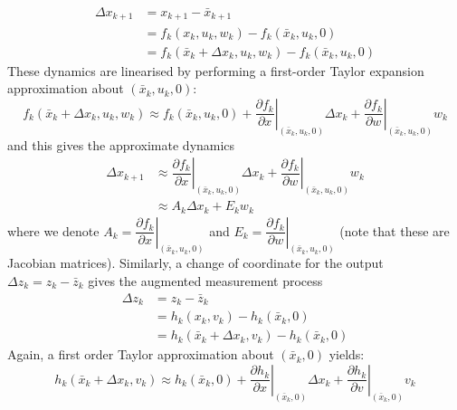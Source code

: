 \documentclass[11pt]{report} %
\begin{document}
\begin{align}
\Delta x_{k + 1} &= x_{k + 1} - \bar{x}_{k + 1} \\
&= f_{k}\left(x_{k}, u_{k}, w_{k}\right) - f_{k}\left(\bar{x}_{k}, u_{k}, 0\right) \\
&= f_{k}\left(\bar{x}_{k} + \Delta x_{k}, u_{k}, w_{k}\right) - f_{k}\left(\bar{x}_{k}, u_{k}, 0\right)
\end{align}
These dynamics are linearised by performing a first-order Taylor expansion approximation about $\left(\bar{x}_{k}, u_{k}, 0\right)$:
\begin{equation}
f_{k}\left(\bar{x}_{k} + \Delta x_{k}, u_{k}, w_{k}\right) \approx f_{k}\left(\bar{x}_{k}, u_{k}, 0\right) + \left.\dfrac{\partial f_{k}}{\partial x}\right|_{\left(\bar{x}_{k}, u_{k}, 0\right)}\Delta x_{k} + \left.\dfrac{\partial f_{k}}{\partial w}\right|_{\left(\bar{x}_{k}, u_{k}, 0\right)}w_{k}
\end{equation}
and this gives the approximate dynamics
\begin{align}
\Delta x_{k + 1} &\approx \left.\dfrac{\partial f_{k}}{\partial x}\right|_{\left(\bar{x}_{k}, u_{k}, 0\right)}\Delta x_{k} + \left.\dfrac{\partial f_{k}}{\partial w}\right|_{\left(\bar{x}_{k}, u_{k}, 0\right)}w_{k} \\
&\approx A_{k}\Delta x_{k} + E_{k}w_{k}
\end{align}
where we denote $A_{k} = \left.\dfrac{\partial f_{k}}{\partial x}\right|_{\left(\bar{x}_{k}, u_{k}, 0\right)}$ and $E_{k} = \left.\dfrac{\partial f_{k}}{\partial w}\right|_{\left(\bar{x}_{k}, u_{k}, 0\right)}$ (note that these are Jacobian matrices). Similarly, a change of coordinate for the output $\Delta z_{k} = z_{k} - \bar{z}_{k}$ gives the augmented measurement process
\begin{align}
\Delta z_{k} &= z_{k} - \bar{z}_{k} \\
&= h_{k}\left(x_{k}, v_{k}\right) - h_{k}\left(\bar{x}_{k}, 0\right) \\
&= h_{k}\left(\bar{x}_{k} + \Delta x_{k}, v_{k}\right) - h_{k}\left(\bar{x}_{k}, 0\right)
\end{align}
Again, a first order Taylor approximation about $\left(\bar{x}_{k}, 0\right)$ yields:
\begin{equation}
h_{k}\left(\bar{x}_{k} + \Delta x_{k}, v_{k}\right) \approx h_{k}\left(\bar{x}_{k}, 0\right) + \left.\dfrac{\partial h_{k}}{\partial x}\right|_{\left(\bar{x}_{k}, 0\right)}\Delta x_{k} + \left.\dfrac{\partial h_{k}}{\partial v}\right|_{\left(\bar{x}_{k}, 0\right)}v_{k}
\end{equation}
\end{document}
